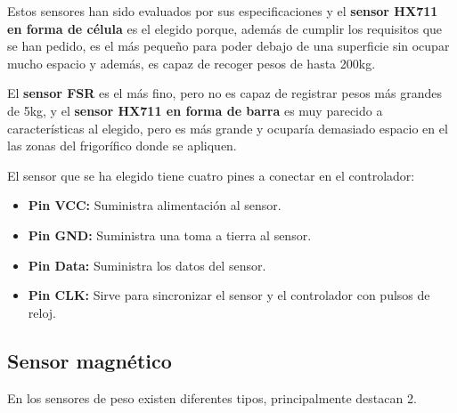 Estos sensores han sido evaluados por sus especificaciones y el \textbf{sensor HX711 en forma de célula} es el elegido porque, además de cumplir los requisitos que se han pedido, es el más pequeño para poder debajo de una superficie sin ocupar mucho espacio y además, es capaz de recoger pesos de hasta 200kg.

El \textbf{sensor FSR} es el más fino, pero no es capaz de registrar pesos más grandes de 5kg, y el \textbf{sensor HX711 en forma de barra} es muy parecido a características al elegido, pero es más grande y ocuparía demasiado espacio en el las zonas del frigorífico donde se apliquen.

El sensor que se ha elegido tiene cuatro pines a conectar en el controlador: 
\begin{itemize}
    \item \textbf{Pin VCC:} Suministra alimentación al sensor.
    \item \textbf{Pin GND:} Suministra una toma a tierra al sensor.
    \item \textbf{Pin Data:} Suministra los datos del sensor.
    \item \textbf{Pin CLK:} Sirve para sincronizar el sensor y el controlador con pulsos de reloj.
\end{itemize}

\subsection{Sensor magnético}

En los sensores de peso existen diferentes tipos, principalmente destacan 2.

